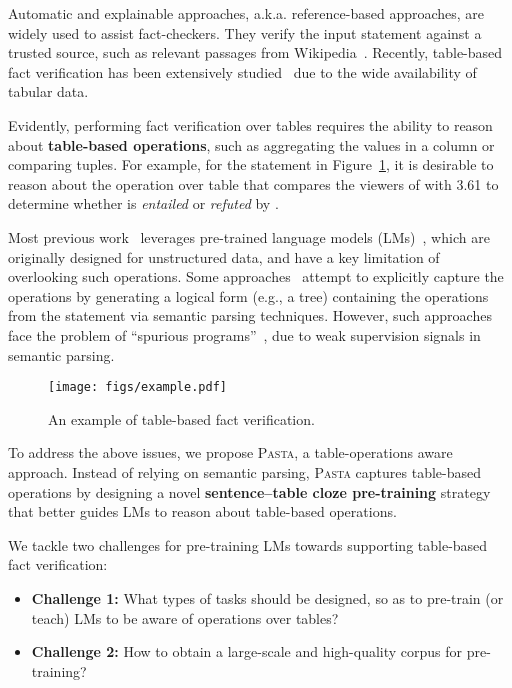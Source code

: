 \documentclass[11pt]{article}
\newcommand{\pasta}{\textsc{Pasta}\xspace}
\newcommand{\eg}{{e.g.,}\xspace}
\newcommand{\aka}{{a.k.a.}\xspace}
\newcommand{\term}[1]{\xspace}
\begin{document}
Automatic and explainable approaches, \aka reference-based approaches, are widely used to assist fact-checkers. They verify the input statement against a trusted source, such as relevant passages from Wikipedia~\cite{DBLP:conf/www/PopatMSW17,DBLP:conf/naacl/ThorneVCM18,DBLP:conf/acl/ShaarBMN20}.
Recently, table-based fact verification has been extensively studied~\cite{tabfact,logicfactchecker,tapasfv} due to the wide availability of tabular data.


Evidently, performing fact verification over tables requires the ability to reason about \textbf{table-based operations}, such as aggregating the values in a column or comparing tuples.
For example, for the statement  in Figure~\ref{fig:fv_example}, it is desirable to reason about the {operation} over table  that compares the viewers of \term{Night~Moves} with {3.61} to determine whether  is \emph{entailed} or \emph{refuted} by .

Most previous work~\cite{tapas,salience,joint} leverages pre-trained language models (LMs)~\cite{bert,roberta}, which are originally designed for unstructured data, 
and have a key limitation of overlooking such operations.
Some approaches~\cite{logicfactchecker,progvgat} attempt to explicitly capture the operations by generating a logical form (\eg a tree) containing the operations from the statement via semantic parsing techniques.
However, such approaches face the problem of ``spurious programs''~\cite{tabfact}, due to weak supervision signals in semantic parsing.




\begin{figure}[tbh]
	\centering
	\texttt{[image: figs/example.pdf]}
\caption{An example of table-based fact verification.}
\label{fig:fv_example}
\end{figure}



To address the above issues, we propose \pasta,
a table-operations aware approach. Instead of relying on semantic parsing, \pasta captures table-based operations by designing a novel \textbf{sentence--table cloze pre-training} strategy that better guides LMs to reason about table-based operations. 

We tackle two challenges for pre-training LMs towards supporting table-based fact verification:
\begin{itemize}
    \item {\bf Challenge 1:} What types of tasks should be designed, so as to pre-train (or teach) LMs to be aware of operations over tables? 
    \item {\bf Challenge 2:} How to obtain a large-scale and high-quality corpus for pre-training?
\end{itemize}
\end{document}
